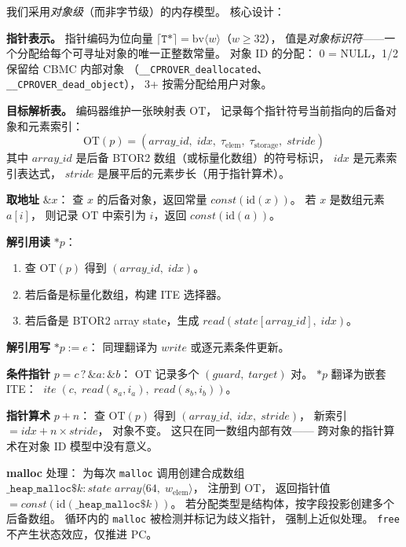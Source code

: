 \documentclass[11pt,a4paper]{article}
\newcommand{\ite}{\mathop{\mathit{ite}}}
\begin{document}
我们采用\emph{对象级}（而非字节级）的内存模型。
核心设计：

\textbf{指针表示。}
指针编码为位向量 $\lceil \texttt{T*} \rceil = \mathrm{bv}\langle w \rangle$（$w \geq 32$），
值是\emph{对象标识符}——一个分配给每个可寻址对象的唯一正整数常量。
对象 ID 的分配：
0 = NULL，1/2 保留给 CBMC 内部对象
（\texttt{\_\_CPROVER\_deallocated}、\texttt{\_\_CPROVER\_dead\_object}），
3+ 按需分配给用户对象。

\textbf{目标解析表。}
编码器维护一张映射表 $\mathrm{OT}$，
记录每个指针符号当前指向的后备对象和元素索引：
\[
\mathrm{OT}(p) = (\mathit{array\_id},\; \mathit{idx},\; \tau_{\mathrm{elem}},\; \tau_{\mathrm{storage}},\; \mathit{stride})
\]
其中 $\mathit{array\_id}$ 是后备 BTOR2 数组（或标量化数组）的符号标识，
$\mathit{idx}$ 是元素索引表达式，
$\mathit{stride}$ 是展平后的元素步长（用于指针算术）。

\textbf{取地址} $\&x$：
查 $x$ 的后备对象，返回常量 $\mathit{const}(\mathrm{id}(x))$。
若 $x$ 是数组元素 $a[i]$，
则记录 $\mathrm{OT}$ 中索引为 $i$，返回 $\mathit{const}(\mathrm{id}(a))$。

\textbf{解引用读} $*p$：
\begin{enumerate}
\item 查 $\mathrm{OT}(p)$ 得到 $(\mathit{array\_id},\; \mathit{idx})$。
\item 若后备是标量化数组，构建 ITE 选择器。
\item 若后备是 BTOR2 array state，生成 $\mathit{read}(\mathit{state}[\mathit{array\_id}],\; \mathit{idx})$。
\end{enumerate}

\textbf{解引用写} $*p := e$：
同理翻译为 $\mathit{write}$ 或逐元素条件更新。

\textbf{条件指针} $p = c\,?\,\&a : \&b$：
$\mathrm{OT}$ 记录多个 $(\mathit{guard},\; \mathit{target})$ 对。
$*p$ 翻译为嵌套 ITE：
$\ite(c,\; \mathit{read}(s_a, i_a),\; \mathit{read}(s_b, i_b))$。

\textbf{指针算术} $p + n$：
查 $\mathrm{OT}(p)$ 得到 $(\mathit{array\_id},\; \mathit{idx},\; \mathit{stride})$，
新索引 $= \mathit{idx} + n \times \mathit{stride}$，
对象不变。
这只在同一数组内部有效——
跨对象的指针算术在对象 ID 模型中没有意义。

\textbf{malloc} 处理：
为每次 \texttt{malloc} 调用创建合成数组
$\_\mathtt{heap\_malloc\$}k : \mathit{state}\;\mathit{array}\langle 64,\; w_{\mathrm{elem}} \rangle$，
注册到 $\mathrm{OT}$，
返回指针值 $= \mathit{const}(\mathrm{id}(\_\mathtt{heap\_malloc\$}k))$。
若分配类型是结构体，按字段投影创建多个后备数组。
循环内的 \texttt{malloc} 被检测并标记为歧义指针，
强制上近似处理。
\texttt{free} 不产生状态效应，仅推进 PC。
\end{document}
